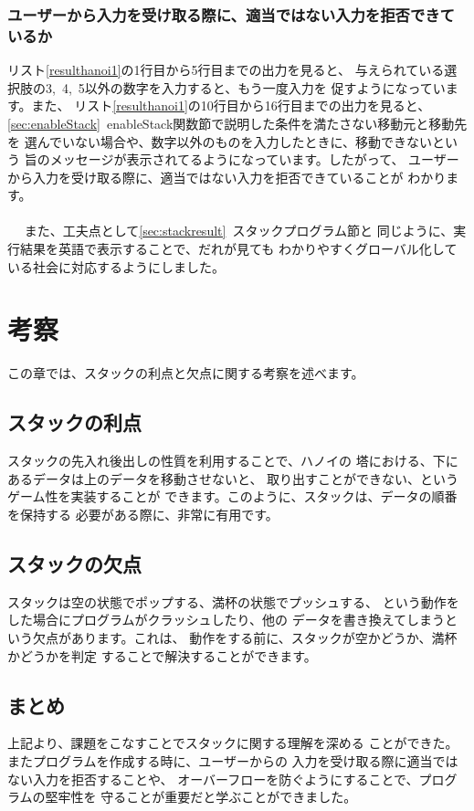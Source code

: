 \documentclass[a4j]{jarticle}
\begin{document}
\subsubsection{ユーザーから入力を受け取る際に、適当ではない入力を拒否できているか}
リスト\ref{resulthanoi1}の1行目から5行目までの出力を見ると、
与えられている選択肢の3,~4,~5以外の数字を入力すると、もう一度入力を
促すようになっています。また、
リスト\ref{resulthanoi1}の10行目から16行目までの出力を見ると、
\ref{sec:enableStack}~enableStack関数節で説明した条件を満たさない移動元と移動先を
選んでいない場合や、数字以外のものを入力したときに、移動できないという
旨のメッセージが表示されてるようになっています。したがって、
ユーザーから入力を受け取る際に、適当ではない入力を拒否できていることが
わかります。
\\\\~~
また、工夫点として\ref{sec:stackresult}~スタックプログラム節と
同じように、実行結果を英語で表示することで、だれが見ても
わかりやすくグローバル化している社会に対応するようにしました。

\section{考察}
この章では、スタックの利点と欠点に関する考察を述べます。
\subsection{スタックの利点}
スタックの先入れ後出しの性質を利用することで、ハノイの
塔における、下にあるデータは上のデータを移動させないと、
取り出すことができない、というゲーム性を実装することが
できます。このように、スタックは、データの順番を保持する
必要がある際に、非常に有用です。
\subsection{スタックの欠点}
スタックは空の状態でポップする、満杯の状態でプッシュする、
という動作をした場合にプログラムがクラッシュしたり、他の
データを書き換えてしまうという欠点があります。これは、
動作をする前に、スタックが空かどうか、満杯かどうかを判定
することで解決することができます。

\subsection{まとめ}
上記より、課題をこなすことでスタックに関する理解を深める
ことができた。
またプログラムを作成する時に、ユーザーからの
入力を受け取る際に適当ではない入力を拒否することや、
オーバーフローを防ぐようにすることで、プログラムの堅牢性を
守ることが重要だと学ぶことができました。
\end{document}

